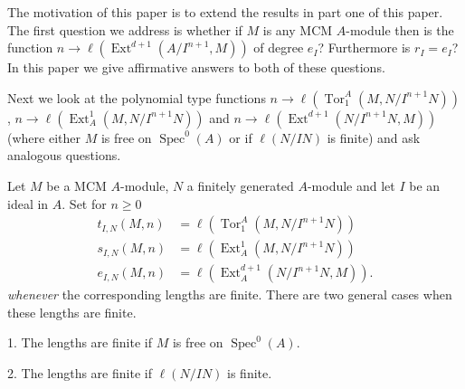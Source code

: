 \documentclass{amsart}
\newcommand{\rt}{\rightarrow}
\newcommand{\Tor}{\operatorname{Tor}}
\newcommand{\Spec}{\operatorname{Spec}}
\newcommand{\Ext}{\operatorname{Ext}}
\theoremstyle{plain}
\theoremstyle{definition}
\theoremstyle{remark}
\begin{document}
\s The motivation of this paper is to extend the results in part one of this paper.
The first question we address is whether  if $M$ is any MCM $A$-module then is  the function $n \rt \ell(\Ext^{d+1}(A/I^{n+1}, M))$
of degree $e_I$? Furthermore is $r_I = e_I$? In this paper we give affirmative answers to both of these questions.

Next we look at the polynomial type functions  $n \rt \ell(\Tor^A_1(M, N/I^{n+1}N))$, $n \rt \ell(\Ext^1_A(M, N/I^{n+1}N))$ and $n \rt \ell(\Ext^{d+1}(N/I^{n+1}N, M))$ (where either $M$ is free on $\Spec^0(A)$ or if $\ell(N/IN)$ is finite) and ask analogous questions.

\s Let $M$ be a MCM $A$-module, $N$ a finitely generated $A$-module and let $I$ be an ideal in $A$.
Set for $n \geq 0$
\begin{align*}
  t_{I, N}(M,n) &=  \ell(\Tor^A_1(M, N/I^{n+1}N)) \\
  s_{I, N}(M,n) &= \ell(\Ext^1_A(M, N/I^{n+1}N)) \\
  e_{I, N}(M, n) &= \ell(\Ext^{d+1}_A( N/I^{n+1}N, M)).
\end{align*}
\emph{whenever} the corresponding lengths are finite. There  are two general cases when these lengths are finite.

1. The lengths are finite if $M$ is free on $\Spec^0(A)$.

2. The lengths are finite if $\ell(N/IN)$ is finite.
\end{document}
